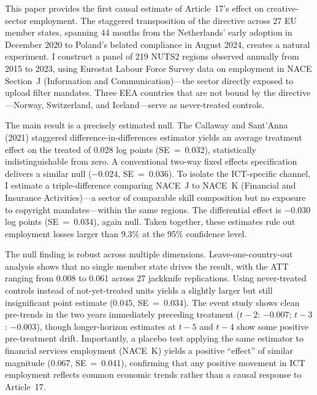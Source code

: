 \documentclass[12pt]{article}
\begin{document}
This paper provides the first causal estimate of Article~17's effect on creative-sector employment. The staggered transposition of the directive across 27 EU member states, spanning 44 months from the Netherlands' early adoption in December 2020 to Poland's belated compliance in August 2024, creates a natural experiment. I construct a panel of 219 NUTS2 regions observed annually from 2015 to 2023, using Eurostat Labour Force Survey data on employment in NACE Section~J (Information and Communication)---the sector directly exposed to upload filter mandates. Three EEA countries that are not bound by the directive---Norway, Switzerland, and Iceland---serve as never-treated controls.

The main result is a precisely estimated null. The Callaway and Sant'Anna (2021) staggered difference-in-differences estimator yields an average treatment effect on the treated of 0.028 log points (SE~=~0.032), statistically indistinguishable from zero. A conventional two-way fixed effects specification delivers a similar null ($-0.024$, SE~=~0.036). To isolate the ICT-specific channel, I estimate a triple-difference comparing NACE~J to NACE~K (Financial and Insurance Activities)---a sector of comparable skill composition but no exposure to copyright mandates---within the same regions. The differential effect is $-0.030$ log points (SE~=~0.034), again null. Taken together, these estimates rule out employment losses larger than 9.3\% at the 95\% confidence level.

The null finding is robust across multiple dimensions. Leave-one-country-out analysis shows that no single member state drives the result, with the ATT ranging from 0.008 to 0.061 across 27 jackknife replications. Using never-treated controls instead of not-yet-treated units yields a slightly larger but still insignificant point estimate (0.045, SE~=~0.034). The event study shows clean pre-trends in the two years immediately preceding treatment ($t-2$: $-0.007$; $t-3$: $-0.003$), though longer-horizon estimates at $t-5$ and $t-4$ show some positive pre-treatment drift. Importantly, a placebo test applying the same estimator to financial services employment (NACE~K) yields a positive ``effect'' of similar magnitude (0.067, SE~=~0.041), confirming that any positive movement in ICT employment reflects common economic trends rather than a causal response to Article~17.
\end{document}
